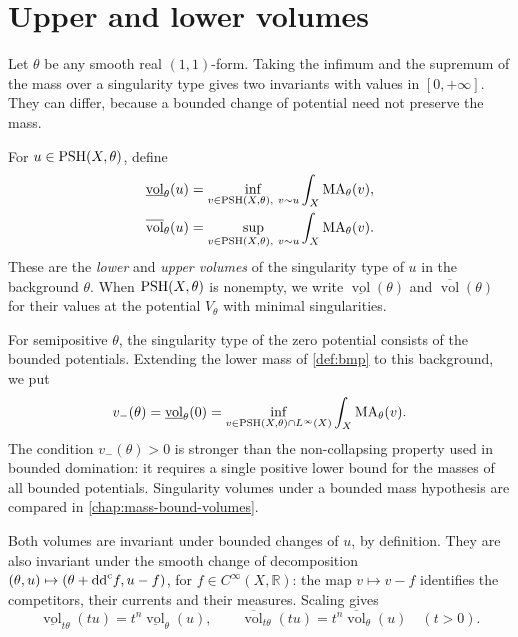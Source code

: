 \section{Upper and lower volumes}

Let $\theta$ be any smooth real $(1,1)$-form. Taking the infimum and the supremum of the mass over a singularity type gives two invariants with values in $[0,+\infty]$. They can differ, because a bounded change of potential need not preserve the mass.

\begin{definition}\label{def:singularity-volumes}
For $u\in\mathrm{PSH}(X,\theta)$, define
\[
 \begin{split}
 \underline{\operatorname{vol}}_\theta(u)
  &=\inf_{v\in\mathrm{PSH}(X,\theta),\ v\sim u}
       \int_X\mathrm{MA}_\theta(v),\\
 \overline{\operatorname{vol}}_\theta(u)
  &=\sup_{v\in\mathrm{PSH}(X,\theta),\ v\sim u}
       \int_X\mathrm{MA}_\theta(v).
 \end{split}
\]
These are the \emph{lower} and \emph{upper volumes} of the singularity type of $u$ in the background $\theta$. When $\mathrm{PSH}(X,\theta)$ is nonempty, we write $\underline{\operatorname{vol}}(\theta)$ and $\overline{\operatorname{vol}}(\theta)$ for their values at the potential $V_\theta$ with minimal singularities.
\end{definition}

For semipositive $\theta$, the singularity type of the zero potential consists of the bounded potentials. Extending the lower mass of \cref{def:bmp} to this background, we put
\[
 v_-(\theta)=\underline{\operatorname{vol}}_\theta(0)
 =\inf_{v\in\mathrm{PSH}(X,\theta)\cap L^\infty(X)}
                      \int_X\mathrm{MA}_\theta(v).
\]
The condition $v_-(\theta)>0$ is stronger than the non-collapsing property used in bounded domination: it requires a single positive lower bound for the masses of all bounded potentials. Singularity volumes under a bounded mass hypothesis are compared in \cref{chap:mass-bound-volumes}.

Both volumes are invariant under bounded changes of $u$, by definition. They are also invariant under the smooth change of decomposition $(\theta,u)\mapsto(\theta+\mathrm{dd}^{\mathrm{c}} f,u-f)$, for $f\in C^\infty(X,\mathbb R)$: the map $v\mapsto v-f$ identifies the competitors, their currents and their measures. Scaling gives
\[
 \underline{\operatorname{vol}}_{t\theta}(tu)
  =t^n\underline{\operatorname{vol}}_\theta(u),\qquad
 \overline{\operatorname{vol}}_{t\theta}(tu)
  =t^n\overline{\operatorname{vol}}_\theta(u)\quad(t>0).
\]

